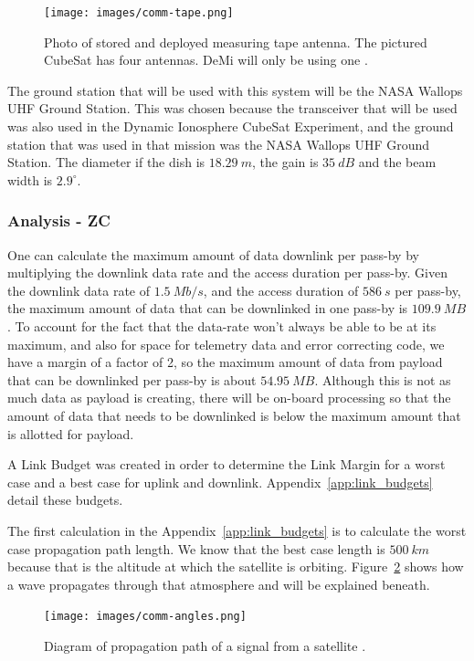 \documentclass[12pt]{article}
\begin{document}
\begin{figure}[ht]
\centering
  \texttt{[image: images/comm-tape.png]}
\caption{Photo of stored and deployed measuring tape antenna. The pictured CubeSat has four antennas. DeMi will only be using one \cite{antenna}.}
\label{fig:comm_tape}
\end{figure}

The ground station that will be used with this system will be the NASA Wallops UHF Ground Station. This was chosen because the transceiver that will be used was also used in the Dynamic Ionosphere CubeSat Experiment, and the ground station that was used in that mission was the NASA Wallops UHF Ground Station. The diameter if the dish is $18.29\ m$, the gain is $35\ dB$ and the beam width is $2.9^\circ$.

			\subsubsection{Analysis - ZC}

One can calculate the maximum amount of data downlink per pass-by by multiplying the downlink data rate and the access duration per pass-by. Given the downlink data rate of $1.5\ Mb/s$, and the access duration of $586\ s$ per pass-by, the maximum amount of data that can be downlinked in one pass-by is $109.9\ MB$. To account for the fact that the data-rate won’t always be able to be at its maximum, and also for space for telemetry data and error correcting code, we have a margin of a factor of 2, so the maximum amount of data from payload that can be downlinked per pass-by is about $54.95\ MB$. Although this is not as much data as payload is creating, there will be on-board processing so that the amount of data that needs to be downlinked is below the maximum amount that is allotted for payload.

A Link Budget was created in order to determine the Link Margin for a worst case and a best case for uplink and downlink. Appendix~\ref{app:link_budgets} detail these budgets.

The first calculation in the Appendix~\ref{app:link_budgets} is to calculate the worst case propagation path length. We know that the best case length is $500\ km$ because that is the altitude at which the satellite is orbiting. Figure~\ref{fig:comm_angles} shows how a wave propagates through that atmosphere and will be explained beneath.

\begin{figure}[ht]
\centering
  \texttt{[image: images/comm-angles.png]}
\caption{Diagram of propagation path of a signal from a satellite \cite{ITU-R}.}
\label{fig:comm_angles}
\end{figure}
\end{document}
